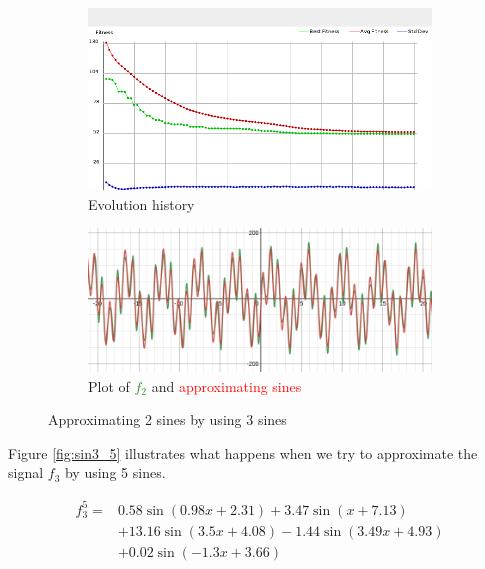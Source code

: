 \documentclass[conference]{IEEEtran}
\begin{document}
\begin{figure}[h]
\centering
\begin{subfigure}{.8\linewidth}
  \centering
  \includegraphics[width=.9\linewidth]{img/sin8_5.png}
  \caption{Evolution history}
  \label{fig:hist_sin2_3}
\end{subfigure}

\begin{subfigure}{.8\linewidth}
  \centering
  \includegraphics[width=.9\linewidth]{img/plot_sin3_2.png}
  \caption{Plot of \textcolor{ForestGreen}{$f_2$} and \textcolor{red}{approximating sines}}
  \label{fig:plot_sin2_3}
\end{subfigure}
\caption{Approximating 2 sines by using 3 sines}
\label{fig:sin2_3}
\end{figure}

Figure \ref{fig:sin3_5} illustrates what happens when we try to approximate the signal $f_3$ by using 5 sines.

\begin{equation}
	\begin{split}
		f_3^5 =& 0.58\sin(0.98x+2.31) + 3.47\sin(x+7.13) \\
			&+ 13.16\sin(3.5x+4.08) - 1.44\sin(3.49x+4.93) \\
			&+ 0.02\sin(-1.3x+3.66)
	\end{split}
	\label{eq:f3_5}
\end{equation}
\end{document}
